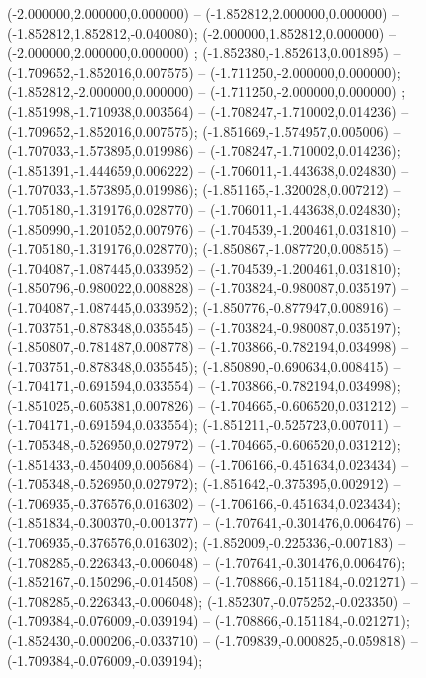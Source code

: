  (-2.000000,2.000000,0.000000) -- (-1.852812,2.000000,0.000000) -- (-1.852812,1.852812,-0.040080);
 (-2.000000,1.852812,0.000000) -- (-2.000000,2.000000,0.000000) ;
 (-1.852380,-1.852613,0.001895) -- (-1.709652,-1.852016,0.007575) -- (-1.711250,-2.000000,0.000000);
 (-1.852812,-2.000000,0.000000) -- (-1.711250,-2.000000,0.000000) ;
 (-1.851998,-1.710938,0.003564) -- (-1.708247,-1.710002,0.014236) -- (-1.709652,-1.852016,0.007575);
 (-1.851669,-1.574957,0.005006) -- (-1.707033,-1.573895,0.019986) -- (-1.708247,-1.710002,0.014236);
 (-1.851391,-1.444659,0.006222) -- (-1.706011,-1.443638,0.024830) -- (-1.707033,-1.573895,0.019986);
 (-1.851165,-1.320028,0.007212) -- (-1.705180,-1.319176,0.028770) -- (-1.706011,-1.443638,0.024830);
 (-1.850990,-1.201052,0.007976) -- (-1.704539,-1.200461,0.031810) -- (-1.705180,-1.319176,0.028770);
 (-1.850867,-1.087720,0.008515) -- (-1.704087,-1.087445,0.033952) -- (-1.704539,-1.200461,0.031810);
 (-1.850796,-0.980022,0.008828) -- (-1.703824,-0.980087,0.035197) -- (-1.704087,-1.087445,0.033952);
 (-1.850776,-0.877947,0.008916) -- (-1.703751,-0.878348,0.035545) -- (-1.703824,-0.980087,0.035197);
 (-1.850807,-0.781487,0.008778) -- (-1.703866,-0.782194,0.034998) -- (-1.703751,-0.878348,0.035545);
 (-1.850890,-0.690634,0.008415) -- (-1.704171,-0.691594,0.033554) -- (-1.703866,-0.782194,0.034998);
 (-1.851025,-0.605381,0.007826) -- (-1.704665,-0.606520,0.031212) -- (-1.704171,-0.691594,0.033554);
 (-1.851211,-0.525723,0.007011) -- (-1.705348,-0.526950,0.027972) -- (-1.704665,-0.606520,0.031212);
 (-1.851433,-0.450409,0.005684) -- (-1.706166,-0.451634,0.023434) -- (-1.705348,-0.526950,0.027972);
 (-1.851642,-0.375395,0.002912) -- (-1.706935,-0.376576,0.016302) -- (-1.706166,-0.451634,0.023434);
 (-1.851834,-0.300370,-0.001377) -- (-1.707641,-0.301476,0.006476) -- (-1.706935,-0.376576,0.016302);
 (-1.852009,-0.225336,-0.007183) -- (-1.708285,-0.226343,-0.006048) -- (-1.707641,-0.301476,0.006476);
 (-1.852167,-0.150296,-0.014508) -- (-1.708866,-0.151184,-0.021271) -- (-1.708285,-0.226343,-0.006048);
 (-1.852307,-0.075252,-0.023350) -- (-1.709384,-0.076009,-0.039194) -- (-1.708866,-0.151184,-0.021271);
 (-1.852430,-0.000206,-0.033710) -- (-1.709839,-0.000825,-0.059818) -- (-1.709384,-0.076009,-0.039194);
